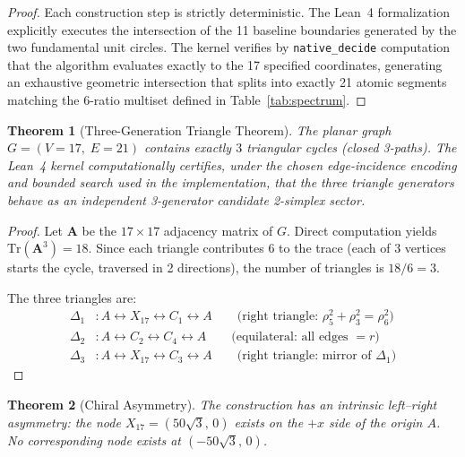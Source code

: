 \documentclass[12pt, a4paper]{article}
\newtheorem{theorem}{Theorem}
\begin{document}
\begin{proof}
Each construction step is strictly deterministic. The Lean~4 formalization explicitly executes the intersection of the 11 baseline boundaries generated by the two fundamental unit circles. The kernel verifies by \texttt{native\_decide} computation that the algorithm evaluates exactly to the 17 specified coordinates, generating an exhaustive geometric intersection that splits into exactly 21 atomic segments matching the 6-ratio multiset defined in Table~\ref{tab:spectrum}.
\end{proof}

\bigskip

\begin{theorem}[Three-Generation Triangle Theorem]
The planar graph $G = (V{=}17,\; E{=}21)$ contains exactly $3$ triangular cycles (closed 3-paths). The Lean~4 kernel computationally certifies, under the chosen edge-incidence encoding and bounded search used in the implementation, that the three triangle generators behave as an independent 3-generator candidate 2-simplex sector.
\end{theorem}

\begin{proof}
Let $\mathbf{A}$ be the $17 \times 17$ adjacency matrix of $G$. Direct computation yields $\mathrm{Tr}(\mathbf{A}^3) = 18$. Since each triangle contributes 6 to the trace (each of 3 vertices starts the cycle, traversed in 2 directions), the number of triangles is $18/6 = 3$.

The three triangles are:
\begin{align}
\Delta_1 &: A \leftrightarrow X_{17} \leftrightarrow C_1 \leftrightarrow A \qquad \text{(right triangle: } \rho_5^2 + \rho_3^2 = \rho_6^2\text{)} \\
\Delta_2 &: A \leftrightarrow C_2 \leftrightarrow C_4 \leftrightarrow A \qquad \text{(equilateral: all edges } = r\text{)} \\
\Delta_3 &: A \leftrightarrow X_{17} \leftrightarrow C_3 \leftrightarrow A \qquad \text{(right triangle: mirror of } \Delta_1\text{)}
\end{align}
\end{proof}

\bigskip

\begin{theorem}[Chiral Asymmetry]
The construction has an intrinsic left--right asymmetry: the node $X_{17} = (50\sqrt{3},\, 0)$ exists on the $+x$ side of the origin $A$. No corresponding node exists at $(-50\sqrt{3},\, 0)$.
\end{theorem}
\end{document}
